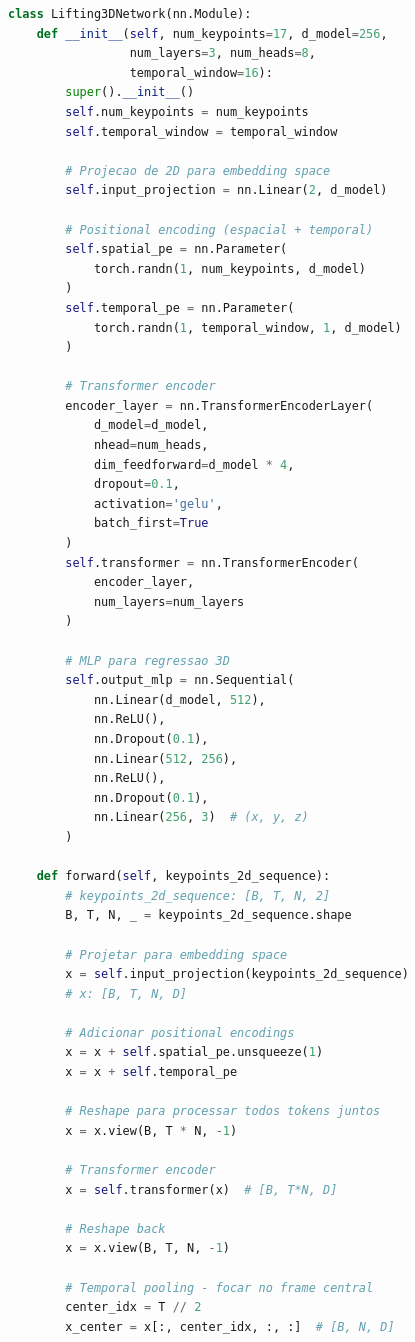 \documentclass[12pt, a4paper]{article}
\begin{document}
\begin{lstlisting}[language=Python, caption=Módulo 3 - Lifting 3D]
class Lifting3DNetwork(nn.Module):
    def __init__(self, num_keypoints=17, d_model=256, 
                 num_layers=3, num_heads=8, 
                 temporal_window=16):
        super().__init__()
        self.num_keypoints = num_keypoints
        self.temporal_window = temporal_window
        
        # Projecao de 2D para embedding space
        self.input_projection = nn.Linear(2, d_model)
        
        # Positional encoding (espacial + temporal)
        self.spatial_pe = nn.Parameter(
            torch.randn(1, num_keypoints, d_model)
        )
        self.temporal_pe = nn.Parameter(
            torch.randn(1, temporal_window, 1, d_model)
        )
        
        # Transformer encoder
        encoder_layer = nn.TransformerEncoderLayer(
            d_model=d_model,
            nhead=num_heads,
            dim_feedforward=d_model * 4,
            dropout=0.1,
            activation='gelu',
            batch_first=True
        )
        self.transformer = nn.TransformerEncoder(
            encoder_layer,
            num_layers=num_layers
        )
        
        # MLP para regressao 3D
        self.output_mlp = nn.Sequential(
            nn.Linear(d_model, 512),
            nn.ReLU(),
            nn.Dropout(0.1),
            nn.Linear(512, 256),
            nn.ReLU(),
            nn.Dropout(0.1),
            nn.Linear(256, 3)  # (x, y, z)
        )
        
    def forward(self, keypoints_2d_sequence):
        # keypoints_2d_sequence: [B, T, N, 2]
        B, T, N, _ = keypoints_2d_sequence.shape
        
        # Projetar para embedding space
        x = self.input_projection(keypoints_2d_sequence)
        # x: [B, T, N, D]
        
        # Adicionar positional encodings
        x = x + self.spatial_pe.unsqueeze(1)
        x = x + self.temporal_pe
        
        # Reshape para processar todos tokens juntos
        x = x.view(B, T * N, -1)
        
        # Transformer encoder
        x = self.transformer(x)  # [B, T*N, D]
        
        # Reshape back
        x = x.view(B, T, N, -1)
        
        # Temporal pooling - focar no frame central
        center_idx = T // 2
        x_center = x[:, center_idx, :, :]  # [B, N, D]
        

\end{lstlisting}
\end{document}

